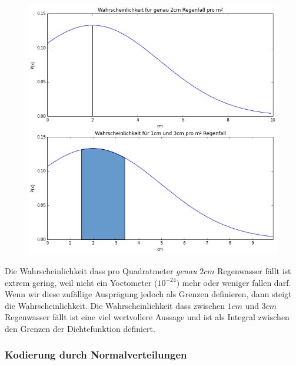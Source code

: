             \begin{figure}[H]

                    \begin{center}
                        \hspace{-1cm}
                        \includegraphics[scale=0.5]{../pictures/diagrams/rainfall-pdf.png}\\
                    \end{center}
            \end{figure}
            \noindent
            Die Wahrscheinlichkeit dass pro Quadratmeter \textit{genau} $2cm$ Regenwasser fällt ist extrem gering, weil nicht ein Yoctometer ($10^{-24})$ mehr oder weniger fallen darf. Wenn wir diese zufällige Ausprägung jedoch als Grenzen definieren, dann steigt die Wahrscheinlichkeit. Die Wahrscheinlichkeit dass zwischen $1cm$ und $3cm$ Regenwasser fällt ist eine viel wertvollere Aussage und ist als Integral zwischen den Grenzen der Dichtefunktion definiert.\\

            \subsubsection*{Kodierung durch Normalverteilungen}

